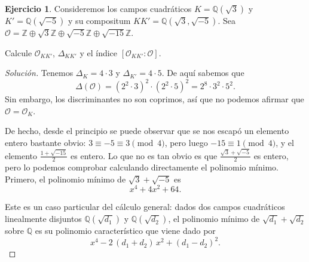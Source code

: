 \documentclass{article}
\newcounter{tarea}
\theoremstyle{definition}
\newtheorem{ejercicio}{Ejercicio}[tarea]
\newenvironment{solucion}{\begin{proof}[Solución]}{\end{proof}}
\newcommand{\ZZ}{\mathbb{Z}}
\newcommand{\QQ}{\mathbb{Q}}
\renewcommand{\O}{\mathcal{O}}
\begin{document}
\begin{ejercicio}
  Consideremos los campos cuadráticos $K = \QQ (\sqrt{3})$ y
  $K' = \QQ (\sqrt{-5})$ y su compositum $KK' = \QQ (\sqrt{3},\sqrt{-5})$.
  Sea $\O = \ZZ \oplus \sqrt{3}\ZZ \oplus \sqrt{-5}\ZZ \oplus \sqrt{-15}\ZZ$.

  Calcule $\O_{KK'}$, $\Delta_{KK'}$ y el índice $[\O_{KK'} : \O]$.

  \ifdefined\solutions
  \begin{solucion}
    Tenemos $\Delta_K = 4\cdot 3$ y $\Delta_{K'} = 4\cdot 5$. De aquí sabemos
    que
    $$\Delta (\O) = (2^2\cdot 3)^2\cdot (2^2\cdot 5)^2 = 2^8\cdot 3^2\cdot 5^2.$$
    Sin embargo, los discriminantes no son coprimos, así que no podemos afirmar
    que $\O = \O_K$.

    De hecho, desde el principio se puede observar que se nos escapó un elemento
    entero bastante obvio: $3 \equiv -5 \equiv 3 \pmod{4}$, pero luego
    $-15\equiv 1\pmod{4}$, y el elemento $\frac{1+\sqrt{-15}}{2}$ es entero.
    Lo que no es tan obvio es que $\frac{\sqrt{3} + \sqrt{-5}}{2}$ es entero,
    pero lo podemos comprobar calculando directamente el polinomio mínimo.
    Primero, el polinomio mínimo de $\sqrt{3} + \sqrt{-5}$ es
    $$x^4 + 4x^2 + 64.$$

    Este es un caso particular del cálculo general: dados dos campos cuadráticos
    linealmente disjuntos $\QQ (\sqrt{d_1})$ y $\QQ (\sqrt{d_2})$, el polinomio
    mínimo de $\sqrt{d_1} + \sqrt{d_2}$ sobre $\QQ$ es su polinomio
    característico que viene dado por
    $$x^4 - 2\,(d_1+d_2)\,x^2 + (d_1 - d_2)^2.$$


\end{solucion}
\end{ejercicio}
\end{document}
